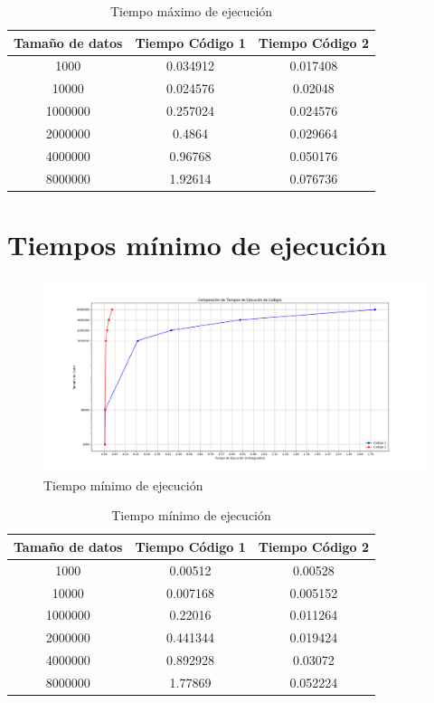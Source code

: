 \documentclass[11pt]{report}
\begin{document}
\begin{table}[H]
  \centering
  \begin{tabular}{|c|c|c|}
    \hline
    \textbf{Tamaño de datos} & \textbf{Tiempo Código 1} & \textbf{Tiempo Código 2} \\ \hline
    1000 & 0.034912 & 0.017408 \\ \hline
    10000 & 0.024576 & 0.02048 \\ \hline
    1000000 & 0.257024 & 0.024576 \\ \hline
    2000000 & 0.4864 & 0.029664 \\ \hline
    4000000 & 0.96768 & 0.050176 \\ \hline
    8000000 & 1.92614 & 0.076736 \\ \hline
  \end{tabular}
  \caption{Tiempo máximo de ejecución}
  \label{tab:tiempo máximo de ejecución}
\end{table}

\section{Tiempos mínimo de ejecución}
\begin{figure}[H]
  \centering
  \includegraphics[scale=0.35]{img/min_times.png}
  \caption{Tiempo mínimo de ejecución}
  \label{fig:tiempo mínimo de ejecución}
\end{figure}

\begin{table}[H]
  \centering
  \begin{tabular}{|c|c|c|}
    \hline
    \textbf{Tamaño de datos} & \textbf{Tiempo Código 1} & \textbf{Tiempo Código 2} \\ \hline
    1000 & 0.00512 & 0.00528 \\ \hline
    10000 & 0.007168 & 0.005152 \\ \hline
    1000000 & 0.22016 & 0.011264 \\ \hline
    2000000 & 0.441344 & 0.019424 \\ \hline
    4000000 & 0.892928 & 0.03072 \\ \hline
    8000000 & 1.77869 & 0.052224 \\ \hline
  \end{tabular}
  \caption{Tiempo mínimo de ejecución}
  \label{tab:tiempo mínimo de ejecución}
\end{table}
\end{document}
